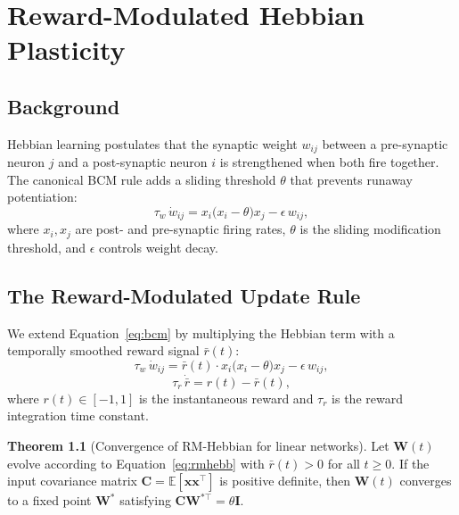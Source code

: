 \documentclass[12pt, a4paper, oneside]{report}
\theoremstyle{definition}
\newtheorem{theorem}{Theorem}[chapter]
\theoremstyle{remark}
\begin{document}
\chapter{Reward-Modulated Hebbian Plasticity}
\label{ch:hebbian}

\section{Background}

Hebbian learning \cite{bienenstock1982} postulates that the synaptic weight $w_{ij}$
between a pre-synaptic neuron $j$ and a post-synaptic neuron $i$ is strengthened when
both fire together.  The canonical BCM rule adds a sliding threshold $\theta$ that
prevents runaway potentiation:
\begin{equation}
  \tau_w\,\dot{w}_{ij} = x_i\bigl(x_i - \theta\bigr)x_j - \epsilon\,w_{ij},
  \label{eq:bcm}
\end{equation}
where $x_i,x_j$ are post- and pre-synaptic firing rates, $\theta$ is the sliding
modification threshold, and $\epsilon$ controls weight decay.

\section{The Reward-Modulated Update Rule}

We extend Equation~\eqref{eq:bcm} by multiplying the Hebbian term with a temporally
smoothed reward signal $\bar{r}(t)$:
\begin{equation}
  \tau_w\,\dot{w}_{ij}
  = \bar{r}(t)\cdot x_i\bigl(x_i - \theta\bigr)x_j
    - \epsilon\,w_{ij},
  \label{eq:rmhebb}
\end{equation}
\begin{equation}
  \tau_r\,\dot{\bar{r}} = r(t) - \bar{r}(t),
  \label{eq:rewardfilter}
\end{equation}
where $r(t) \in [-1, 1]$ is the instantaneous reward and $\tau_r$ is the reward
integration time constant.

\begin{theorem}[Convergence of RM-Hebbian for linear networks]
\label{thm:convergence}
Let $\mathbf{W}(t)$ evolve according to Equation~\eqref{eq:rmhebb} with $\bar{r}(t) > 0$
for all $t \geq 0$.  If the input covariance matrix $\mathbf{C} = \mathbb{E}[\mathbf{x}\mathbf{x}^{\top}]$
is positive definite, then $\mathbf{W}(t)$ converges to a fixed point $\mathbf{W}^*$
satisfying $\mathbf{C}\mathbf{W}^{*\top} = \theta\mathbf{I}$.
\end{theorem}
\end{document}
